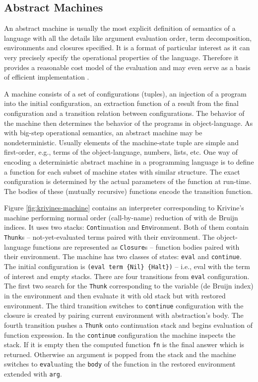 \subsection*{Abstract Machines}
An abstract machine \cite{landin-secd} is usually the most explicit definition of semantics of a language with all the details like argument evaluation order, term decomposition, environments and closures specified.
It is a format of particular interest as it can very precisely specify the operational properties of the language.
Therefore it provides a reasonable cost model of the evaluation and may even serve as a basis of efficient implementation \cite{leroy-zinc}.

A machine consists of a set of configurations (tuples), an injection of a program into the initial configuration, an extraction function of a result from the final configuration and a transition relation between configurations.
The behavior of the machine then determines the behavior of the programs in object-language.
As with big-step operational semantics, an abstract machine may be nondeterministic.
Usually elements of the machine-state tuple are simple and first-order, e.g., terms of the object-language, numbers, lists, etc.
One way of encoding a deterministic abstract machine in a programming language is to define a function for each subset of machine states with similar structure.
The exact configuration is determined by the actual parameters of the function at run-time.
The bodies of these (mutually recursive) functions encode the transition function.

Figure \ref{fig:krivines-machine} contains an interpreter corresponding to Krivine's machine \cite{krivine-machine} performing normal order (call-by-name) reduction of \LC{} with de Bruijn indices.
It uses two stacks: \lstinline!Cont!inuation and \lstinline!Env!ironment.
Both of them contain \lstinline!Thunk!s -- not-yet-evaluated terms paired with their environment.
The object-language functions are represented as \lstinline!Closure!s -- function bodies paired with their environment.
The machine has two classes of states: \lstinline!eval! and \lstinline!continue!.
The initial configuration is \lstinline!(eval term {Nil} {Halt})! -- i.e., eval with the term of interest and empty stacks.
There are four transitions from \lstinline!eval! configuration.
The first two search for the \lstinline!Thunk! corresponding to the variable (de Bruijn index) in the environment and then evaluate it with old stack but with restored environment.
The third transition switches to \lstinline!continue! configuration with the closure is created by pairing current environment with abstraction's body.
The fourth transition pushes a \lstinline!Thunk! onto continuation stack and begins evaluation of function expression.
In the \lstinline!continue! configuration the machine inspects the stack.
If it is empty then the computed function \lstinline!fn! is the final answer which is returned.
Otherwise an argument is popped from the stack and the machine switches to \lstinline!eval!uating the \lstinline!body! of the function in the restored environment extended with \lstinline!arg!.

